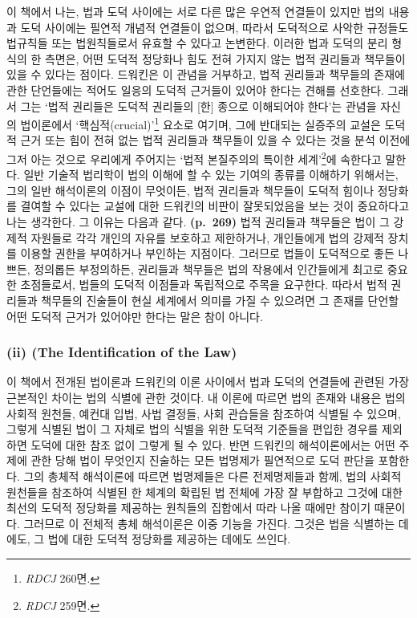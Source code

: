 이 책에서 나는, 법과 도덕 사이에는 서로 다른 많은 우연적 연결들이 있지만
법의 내용과 도덕 사이에는 필연적 개념적 연결들이 없으며, 따라서
도덕적으로 사악한 규정들도 법규칙들 또는 법원칙들로서 유효할 수 있다고
논변한다. 이러한 법과 도덕의 분리 형식의 한 측면은, 어떤 도덕적 정당화나
힘도 전혀 가지지 않는 법적 권리들과 책무들이 있을 수 있다는 점이다.
드워킨은 이 관념을 거부하고, 법적 권리들과 책무들의 존재에 관한
단언들에는 적어도 일응의 도덕적 근거들이 있어야 한다는 견해를 선호한다.
그래서 그는 ‘법적 권리들은 도덕적 권리들의 {[}한{]} 종으로 이해되어야
한다’는 관념을 자신의 법이론에서 ‘핵심적(crucial)’\footnote{\emph{RDCJ}
  260면.} 요소로 여기며, 그에 반대되는 실증주의 교설은 도덕적 근거 또는
힘이 전혀 없는 법적 권리들과 책무들이 있을 수 있다는 것을 분석 이전에
그저 아는 것으로 우리에게 주어지는 ‘법적 본질주의의 특이한
세계’\footnote{\emph{RDCJ} 259면.}에 속한다고 말한다. 일반 기술적
법리학이 법의 이해에 할 수 있는 기여의 종류를 이해하기 위해서는, 그의
일반 해석이론의 이점이 무엇이든, 법적 권리들과 책무들이 도덕적 힘이나
정당화를 결여할 수 있다는 교설에 대한 드워킨의 비판이 잘못되었음을 보는
것이 중요하다고 나는 생각한다. 그 이유는 다음과 같다. \textbf{(p.~269)}
법적 권리들과 책무들은 법이 그 강제적 자원들로 각각 개인의 자유를
보호하고 제한하거나, 개인들에게 법의 강제적 장치를 이용할 권한을
부여하거나 부인하는 지점이다. 그러므로 법들이 도덕적으로 좋든 나쁘든,
정의롭든 부정의하든, 권리들과 책무들은 법의 작용에서 인간들에게 최고로
중요한 초점들로서, 법들의 도덕적 이점들과 독립적으로 주목을 요구한다.
따라서 법적 권리들과 책무들의 진술들이 현실 세계에서 의미를 가질 수
있으려면 그 존재를 단언할 어떤 도덕적 근거가 있어야만 한다는 말은 참이
아니다.

\subsubsection{\texorpdfstring{(ii)  (The Identification
of the
Law)}{(ii) 법의 식별 (The Identification of the Law)}}\label{ii-uxbc95uxc758-uxc2dduxbcc4-the-identification-of-the-law}

이 책에서 전개된 법이론과 드워킨의 이론 사이에서 법과 도덕의 연결들에
관련된 가장 근본적인 차이는 법의 식별에 관한 것이다. 내 이론에 따르면
법의 존재와 내용은 법의 사회적 원천들, 예컨대 입법, 사법 결정들, 사회
관습들을 참조하여 식별될 수 있으며, 그렇게 식별된 법이 그 자체로 법의
식별을 위한 도덕적 기준들을 편입한 경우를 제외하면 도덕에 대한 참조 없이
그렇게 될 수 있다. 반면 드워킨의 해석이론에서는 어떤 주제에 관한 당해
법이 무엇인지 진술하는 모든 법명제가 필연적으로 도덕 판단을 포함한다.
그의 총체적 해석이론에 따르면 법명제들은 다른 전제명제들과 함께, 법의
사회적 원천들을 참조하여 식별된 한 체계의 확립된 법 전체에 가장 잘
부합하고 그것에 대한 최선의 도덕적 정당화를 제공하는 원칙들의 집합에서
따라 나올 때에만 참이기 때문이다. 그러므로 이 전체적 총체 해석이론은
이중 기능을 가진다. 그것은 법을 식별하는 데에도, 그 법에 대한 도덕적
정당화를 제공하는 데에도 쓰인다.

